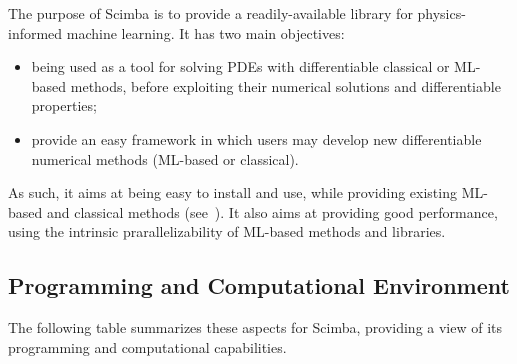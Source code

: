 The purpose of Scimba is to provide a readily-available
library for physics-informed machine learning.
It has two main objectives:
\begin{itemize}
    \item being used as a tool for solving PDEs
          with differentiable classical or ML-based methods,
          before exploiting their numerical solutions
          and differentiable properties;
    \item provide an easy framework in which users
          may develop new differentiable numerical methods
          (ML-based or classical).
\end{itemize}
As such, it aims at being easy to install and use,
while providing existing ML-based and classical methods
(see~).
It also aims at providing good performance,
using the intrinsic prarallelizability of
ML-based methods and libraries.

\subsection{Programming and Computational Environment}
\label{sec::Scimba:environment_capabilities}

The following table summarizes these aspects for Scimba, providing a  view of its programming and computational capabilities.

